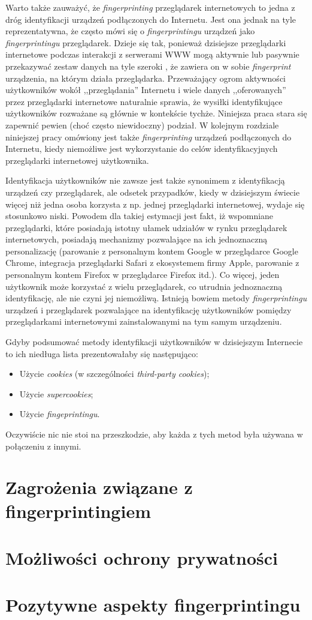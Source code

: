 Warto także zauważyć, że \emph{fingerprinting} przeglądarek internetowych to
jedna z dróg identyfikacji urządzeń podłączonych do Internetu. Jest ona jednak
na tyle reprezentatywna, że często mówi się o \emph{fingerprintingu} urządzeń
jako \emph{fingerprintingu} przeglądarek. Dzieje się tak, ponieważ dzisiejsze
przeglądarki internetowe podczas interakcji z serwerami WWW mogą aktywnie lub
pasywnie przekazywać zestaw danych na tyle szeroki \cite{eckersley2010unique},
że zawiera on w sobie \emph{fingerprint} urządzenia, na którym działa
przeglądarka. Przeważający ogrom aktywności użytkowników wokół ,,przeglądania''
Internetu i wiele danych ,,oferowanych'' przez przeglądarki internetowe
naturalnie sprawia, że wysiłki identyfikujące użytkowników rozważane są głównie
w kontekście tychże. Niniejsza praca stara się zapewnić pewien (choć często
niewidoczny) podział. W kolejnym rozdziale niniejszej pracy omówiony jest także
\emph{fingerprinting} urządzeń podłączonych do Internetu, kiedy niemożliwe jest
wykorzystanie do celów identyfikacyjnych przeglądarki internetowej użytkownika.

Identyfikacja użytkowników nie zawsze jest także synonimem z identyfikacją
urządzeń czy przeglądarek, ale odsetek przypadków, kiedy w dzisiejszym świecie
więcej niż jedna osoba korzysta z np. jednej przeglądarki internetowej, wydaje
się stosunkowo niski. Powodem dla takiej estymacji jest fakt, iż wspomniane
przeglądarki, które posiadają istotny ułamek udziałów w rynku przeglądarek
internetowych, posiadają mechanizmy pozwalające na ich jednoznaczną
personalizację (parowanie z personalnym kontem Google w przeglądarce Google
Chrome, integracja przeglądarki Safari z ekosystemem firmy Apple, parowanie z
personalnym kontem Firefox w przeglądarce Firefox itd.). Co więcej, jeden
użytkownik może korzystać z wielu przeglądarek, co utrudnia jednoznaczną
identyfikację, ale nie czyni jej niemożliwą. Istnieją bowiem metody
\emph{fingerprintingu} urządzeń i przeglądarek pozwalające na identyfikację
użytkowników pomiędzy przeglądarkami internetowymi zainstalowanymi na tym samym
urządzeniu.

Gdyby podsumować metody identyfikacji użytkowników w dzisiejszym Internecie to
ich niedługa lista prezentowałaby się następująco:
\begin{itemize}
	\item Użycie \emph{cookies} (w szczególności \emph{third-party cookies});
	\item Użycie \emph{supercookies};
	\item Użycie \emph{fingeprintingu}.
\end{itemize}

Oczywiście nic nie stoi na przeszkodzie, aby każda z tych metod była używana w
połączeniu z innymi.

\section{Zagrożenia związane z fingerprintingiem}

\section{Możliwości ochrony prywatności}

\section{Pozytywne aspekty fingerprintingu}
